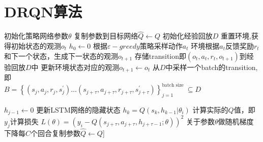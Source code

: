 \documentclass[11pt]{ctexart}
\begin{document}
\section{DRQN算法}
\begin{algorithm}[H] %
	\renewcommand{\thealgorithm}{} %
	\caption{} 
	\renewcommand{\algorithmicrequire}{\textbf{输入:}}  
	\renewcommand{\algorithmicensure}{\textbf{输出:}} 
	\begin{algorithmic}[1]
		\STATE 初始化策略网络参数$\theta$ %
		\STATE 复制参数到目标网络$\hat{Q} \leftarrow Q$
		\STATE 初始化经验回放$D$
		\STATE 重置环境,获得初始状态的观测$o_t$
		\STATE $h_{0} \leftarrow 0$
		\STATE 根据$\varepsilon-greedy$策略采样动作$a_t$
		\STATE 环境根据$a_t$反馈奖励$r_t$和下一个状态，生成下一状态的观测$o_{t+1}$
		\STATE 存储transition即$(o_t,a_t,r_t,o_{t+1})$到经验回放$D$中
		\STATE 更新环境状态对应的观测$o_{t+1} \leftarrow o_t $
		\STATE 从$D$中采样一个batch的transition, 即 
		\\ $B = \left\{(s_{j}, a_{j}, r_{j}, s_{j}^{'}) \dots (s_{j+\tau}, a_{j+\tau}, r_{j+\tau}, s_{j+\tau}^{'})\right\}_{j=1}^{\text {batch size }} \subseteq D$
	
		\STATE $h_{j-1} \leftarrow 0$
		\STATE 更新LSTM网络的隐藏状态 $h_{k} = Q(s_{k}, h_{k-1} | \theta_{i})$
		\ENDFOR
		\STATE 计算实际的$Q$值，即$y_{j}$\footnotemark[2]
		\STATE 计算损失 $L(\theta)=\left(y_{i}-Q\left(s_{j+\tau}, a_{j+\tau}, h_{j+\tau-1} ; \theta\right)\right)^{2}$
		\ENDFOR
		\STATE 关于参数$\theta$做随机梯度下降\footnotemark[3]
		\STATE 每$C$个回合复制参数$\hat{Q}\leftarrow Q$\footnotemark[4]]
		\ENDFOR
		\ENDFOR
	\end{algorithmic}
\end{algorithm}
\clearpage
\end{document}

